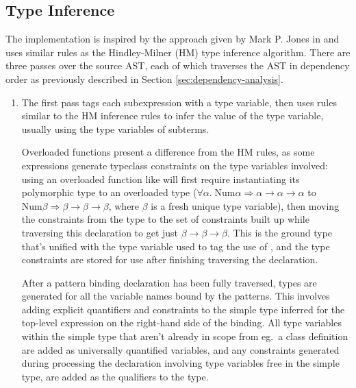 \documentclass[dissertation.tex]{subfiles}
\begin{document}
{{    }
    \subsection{Type Inference}
    {

        The implementation is inspired by the approach given by Mark P. Jones in \cite{THIH} and uses similar rules as
        the Hindley-Milner (HM) type inference algorithm. There are three passes over the source AST, each of which
        traverses the AST in dependency order as previously described in Section \ref{sec:dependency-analysis}.

        \begin{enumerate}
        \item
        {
            
            The first pass tags each subexpression with a type variable, then uses rules similar to the HM inference
            rules to infer the value of the type variable, usually using the type variables of subterms.
            
            Overloaded functions present a difference from the HM rules, as some expressions generate typeclass
            constraints on the type variables involved: using an overloaded function like \haskell{(+)} will first
            require instantiating its polymorphic type to an overloaded type
            (\(\forall\alpha.\;\text{Num}\alpha\Rightarrow\alpha\rightarrow\alpha\rightarrow\alpha\) to
            \(\text{Num}\beta\Rightarrow\beta\rightarrow\beta\rightarrow\beta\), where \(\beta\) is a fresh unique type
            variable), then moving the constraints from the type to the set of constraints built up while traversing
            this declaration to get just \(\beta\rightarrow\beta\rightarrow\beta\). This is the ground type that's
            unified with the type variable used to tag the use of \haskell{(+)}, and the type constraints are stored for
            use after finishing traversing the declaration.

            After a pattern binding declaration has been fully traversed, types are generated for all the variable names
            bound by the patterns. This involves adding explicit quantifiers and constraints to the simple type inferred
            for the top-level expression on the right-hand side of the binding. All type variables within the simple
            type that aren't already in scope from eg.\ a class definition are added as universally quantified
            variables, and any constraints generated during processing the declaration involving type variables free in
            the simple type, are added as the qualifiers to the type.

}
\end{enumerate}}}
\end{document}
